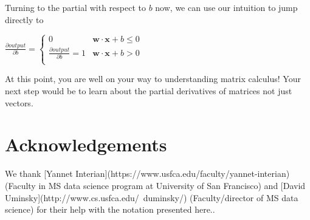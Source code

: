\documentclass[11pt]{article}
\begin{document}
Turning to the partial with respect to $b$ now, we can use our intuition to jump directly to

$\frac{\partial output}{\partial b} = \begin{cases}
	0 & \mathbf{w} \cdot \mathbf{x} + b \leq 0\\
	\frac{\partial output}{\partial b} = 1 & \mathbf{w} \cdot \mathbf{x} + b > 0\\
\end{cases}
$

At this point, you are well on your way to understanding matrix calculus!  Your next step would be to learn about the partial derivatives of matrices not just vectors.
 
\section{Acknowledgements}

We thank [Yannet Interian](https://www.usfca.edu/faculty/yannet-interian) (Faculty in MS data science program at University of San Francisco) and [David Uminsky](http://www.cs.usfca.edu/~duminsky/) (Faculty/director of MS data science) for their help with the notation presented here..
\end{document}
